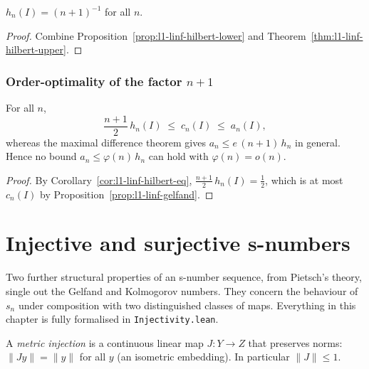 \begin{corollary}
\label{cor:l1-linf-hilbert-eq}
\leanok
$h_n(I) = (n+1)^{-1}$ for all $n$.
\end{corollary}
\begin{proof}
\leanok
{}
Combine Proposition~\ref{prop:l1-linf-hilbert-lower} and
Theorem~\ref{thm:l1-linf-hilbert-upper}.
\end{proof}

\subsection{Order-optimality of the factor \texorpdfstring{$n+1$}{n+1}}
\label{sec:l1-linf-optimal}

\begin{corollary}
\label{cor:l1-linf-order-optimal}
\leanok
{}
For all $n$,
\[
  \frac{n+1}{2}\, h_n(I) \;\le\; c_n(I) \;\le\; a_n(I) ,
\]
whereas the maximal difference theorem gives $a_n \le e\,(n+1)\,h_n$ in general.
Hence no bound $a_n \le \varphi(n)\,h_n$ can hold with $\varphi(n) = o(n)$.
\end{corollary}
\begin{proof}
\leanok
{}
By Corollary~\ref{cor:l1-linf-hilbert-eq}, $\tfrac{n+1}{2}\, h_n(I) = \tfrac12$,
which is at most $c_n(I)$ by Proposition~\ref{prop:l1-linf-gelfand}.
\end{proof}

\chapter{Injective and surjective s-numbers}
\label{ch:injectivity}

Two further structural properties of an s-number sequence, from Pietsch's
theory, single out the Gelfand and Kolmogorov numbers. They concern the
behaviour of $s_n$ under composition with two distinguished classes of maps.
Everything in this chapter is fully formalised in
\texttt{Injectivity.lean}.

\begin{definition}
\label{def:metric-injection}
\leanok
A \emph{metric injection} is a continuous linear map $J : Y \to Z$ that
preserves norms: $\|J y\| = \|y\|$ for all $y$ (an isometric embedding). In
particular $\|J\| \le 1$.
\end{definition}

